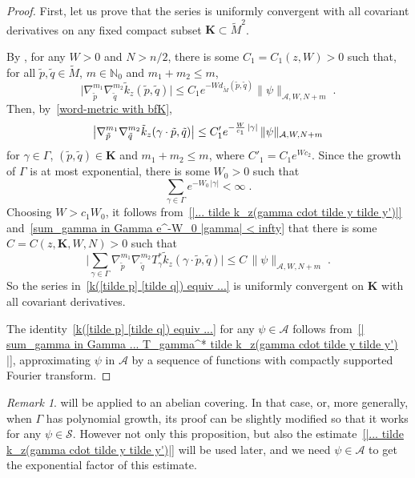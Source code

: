 \documentclass{memo-l}
\theoremstyle{plain}
\theoremstyle{definition}
\theoremstyle{remark}
\newtheorem{rem}[thm]{Remark}
\newcommand{\N}{\mathbb{N}}
\renewcommand{\AA}{\mathcal{A}}
\renewcommand{\SS}{\mathcal{S}}
\newcommand{\bfK}{\boldsymbol{K}}
\numberwithin{section}{chapter}
\numberwithin{equation}{section}%
\begin{document}
\begin{proof}
First, let us prove that the series is uniformly convergent with all covariant derivatives on any fixed compact subset $\bfK\subset{\widetilde M}^2$.

By , for any $W>0$ and $N>n/2$, there is some $C_1=C_1(z,W)>0$ such that, for all $\tilde p,\tilde q\in\widetilde M$, $m\in\N_0$ and $m_1+m_2\le m$,
\[
\big|\nabla_{\tilde p}^{m_1}\nabla_{\tilde q}^{m_2}\tilde k_z(\tilde p,\tilde q)\big|
\le C_1 e^{-Wd_{\widetilde M}(\tilde p,\tilde q)}  \|\psi\|_{\AA, W,N+m}\;.
\]
Then, by~\eqref{word-metric with bfK}, 
\begin{equation}\label{|... tilde k_z(gamma cdot tilde y tilde y')|}
\big|\nabla_{\tilde p}^{m_1}\nabla_{\tilde q}^{m_2}\tilde k_z(\gamma\cdot\tilde p,\tilde q)\big|\\
\le C'_1 e^{-\frac{W}{c_1}\,|\gamma|}\,\|\psi\|_{\AA, W, N+m}
\end{equation}
for $\gamma\in\Gamma$, $(\tilde p,\tilde q)\in\bfK$ and $m_1+m_2\le m$, where $C'_1=C_1e^{Wc_2}$. Since the growth of $\Gamma$ is at most exponential, there is some $W_0>0$ such that
\begin{equation}\label{sum_gamma in Gamma e^-W_0 |gamma| < infty}
\sum_{\gamma\in \Gamma} e^{-W_0\,|\gamma|}<\infty\;.
\end{equation}
Choosing $W>c_1W_0$, it follows from~\eqref{|... tilde k_z(gamma cdot tilde y tilde y')|} and~\eqref{sum_gamma in Gamma e^-W_0 |gamma| < infty} that there is some $C=C(z,\bfK,W,N)>0$ such that
\begin{equation}\label{| sum_gamma in Gamma ... T_gamma^* tilde k_z(gamma cdot tilde y tilde y') |}
\Big|\sum_{\gamma\in \Gamma}\nabla_{\tilde p}^{m_1}\nabla_{\tilde q}^{m_2}
T_\gamma^*\tilde k_z(\gamma\cdot\tilde p,\tilde q)\Big|
\le C\,\|\psi\|_{\AA, W, N+m}\;.
\end{equation}
So the series in~\eqref{k([tilde p] [tilde q]) equiv ...} is uniformly convergent on $\bfK$ with all covariant derivatives.

The identity~\eqref{k([tilde p] [tilde q]) equiv ...} for any $\psi\in\AA$ follows from~\eqref{| sum_gamma in Gamma ... T_gamma^* tilde k_z(gamma cdot tilde y tilde y') |}, approximating $\psi$ in $\AA$ by a sequence of functions with compactly supported Fourier transform.
\end{proof}

\begin{rem}\label{r: k(y y') equiv ...}
 will be applied to an abelian covering. In that case, or, more generally, when $\Gamma$ has polynomial growth, its proof can be slightly modified so that it works for any $\psi\in\SS$. However not only this proposition, but also the estimate~\eqref{|... tilde k_z(gamma cdot tilde y tilde y')|} will be used later, and we need $\psi\in\AA$ to get the exponential factor of this estimate.
\end{rem}
\end{document}
